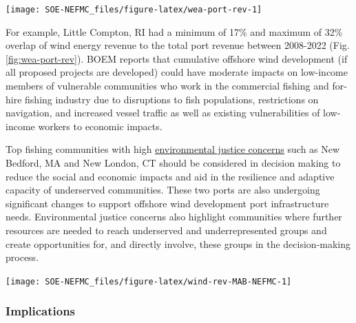 \documentclass[
  10pt,
]{article}
\let\origfigure\figure
\let\endorigfigure\endfigure
\renewenvironment{figure}[1][2] {
    \expandafter\origfigure\expandafter[H]
} {
    \endorigfigure
}
\begin{document}
\begin{figure}

\texttt{[image: SOE-NEFMC\_files/figure-latex/wea-port-rev-1]} \hfill{}

\caption{Percent of port fisheries revenue from Wind Energy Areas (WEA) in descending order from most to least port fisheries revenue from WEA. EJ = Environmental Justice.}\label{fig:wea-port-rev}
\end{figure}

For example, Little Compton, RI had a minimum of 17\% and maximum of 32\% overlap of wind energy revenue to the total port revenue between 2008-2022 (Fig. \ref{fig:wea-port-rev}). BOEM reports that cumulative offshore wind development (if all proposed projects are developed) could have moderate impacts on low-income members of vulnerable communities who work in the commercial fishing and for-hire fishing industry due to disruptions to fish populations, restrictions on navigation, and increased vessel traffic as well as existing vulnerabilities of low-income workers to economic impacts.

Top fishing communities with high \href{https://noaa-edab.github.io/catalog/engagement.html}{environmental justice concerns} such as New Bedford, MA and New London, CT should be considered in decision making to reduce the social and economic impacts and aid in the resilience and adaptive capacity of underserved communities. These two ports are also undergoing significant changes to support offshore wind development port infrastructure needs. Environmental justice concerns also highlight communities where further resources are needed to reach underserved and underrepresented groups and create opportunities for, and directly involve, these groups in the decision-making process.

\begin{figure}

\texttt{[image: SOE-NEFMC\_files/figure-latex/wind-rev-MAB-NEFMC-1]} \hfill{}

\caption{Percent of Mid-Atlantic port revenue with majority NEFMC landings from Wind Energy Areas (WEA) in descending order from most to least port fisheries revenue from WEA. EJ = Environmental Justice.}\label{fig:wind-rev-MAB-NEFMC}
\end{figure}

\hypertarget{implications-6}{%
\subsubsection{Implications}\label{implications-6}}
\end{document}
